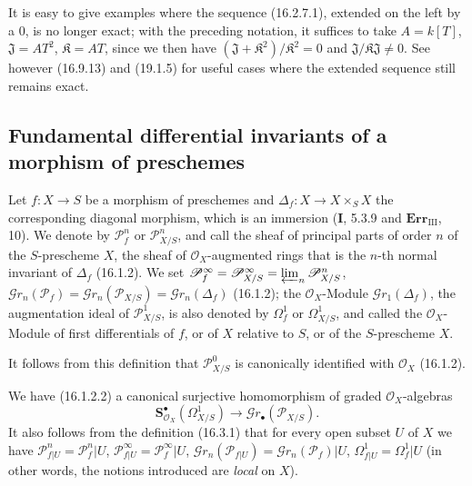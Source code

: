 It is easy to give examples where the sequence (16.2.7.1), extended on the left
by a 0, is no longer exact; with the preceding notation, it suffices to
take $A=k[T]$, $\mathfrak{J}=AT^2$, $\mathfrak{K}=AT$, since we then have
$(\mathfrak{J}+\mathfrak{K}^2)/\mathfrak{K}^2=0$ and
$\mathfrak{J}/\mathfrak{K}\mathfrak{J}\neq 0$. See however (16.9.13) and
(19.1.5) for useful cases where the extended sequence still remains exact.

\subsection{Fundamental differential invariants of a morphism of preschemes}

\begin{definition}[16.3.1]\label{IV.16.3.1}
Let $f:X\to S$ be a morphism of preschemes and $\Delta_f:X\to X\times_S X$
the corresponding diagonal morphism, which is an immersion (\textbf{I}, 5.3.9 and
$\mathbf{Err}_{\mathrm{III}}$, 10). We denote by $\mathscr{P}_f^n$ or
$\mathscr{P}_{X/S}^n$, and call the \textup{sheaf of principal parts of order $n$
of the $S$-prescheme $X$}, the sheaf of $\mathcal{O}_X$-augmented rings that is the
$n$-th normal invariant of $\Delta_f$ \textup{(16.1.2)}. We set
$\mathscr{P}_f^\infty=\mathscr{P}_{X/S}^\infty=
\varprojlim_n\mathscr{P}_{X/S}^n$,
$\mathscr{G}r_n(\mathscr{P}_f)=\mathscr{G}r_n(\mathscr{P}_{X/S})=
\mathscr{G}r_n(\Delta_f)$ \textup{(16.1.2)}; the $\mathcal{O}_X$-Module
$\mathscr{G}r_1(\Delta_f)$, the augmentation ideal of $\mathscr{P}_{X/S}^1$, is
also denoted by $\varOmega_f^1$ or $\varOmega_{X/S}^1$, and called the $\mathcal{O}_X$-Module
of \textup{first differentials} of $f$, or of $X$ relative to $S$, or of the $S$-prescheme $X$.
\end{definition}

It follows from this definition that $\mathscr{P}_{X/S}^0$ is
canonically identified with $\mathcal{O}_X$ (16.1.2).

We have (16.1.2.2) a canonical surjective homomorphism of
graded $\mathcal{O}_X$-algebras
\[
  \mathbf{S}_{\mathcal{O}_X}^{\bullet}(\varOmega_{X/S}^1)
  \longrightarrow\mathscr{G}r_\bullet(\mathscr{P}_{X/S}).
  \tag{16.3.1.1}
  \label{IV.16.3.1.1}
\]
It also follows from the definition (16.3.1) that for every open subset $U$ of $X$ we have
$\mathscr{P}_{f|U}^n=\mathscr{P}_f^n|U$,
$\mathscr{P}_{f|U}^\infty=\mathscr{P}_f^\infty|U$,
$\mathscr{G}r_n(\mathscr{P}_{f|U})=\mathscr{G}r_n(\mathscr{P}_f)|U$,
$\varOmega_{f|U}^1=\varOmega_f^1|U$ (in other words, the notions introduced are
\emph{local} on $X$).

